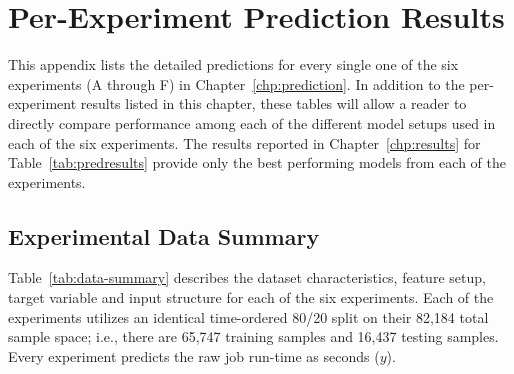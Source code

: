 \appendix

\chapter{Per-Experiment Prediction Results}\label{chp:app1}

This appendix lists the detailed predictions for every single one of the six experiments (A through F) in Chapter~\ref{chp:prediction}. In addition to the per-experiment results listed in this chapter, these tables will allow a reader to directly compare performance among each of the different model setups used in each of the six experiments. The results reported in Chapter~\ref{chp:results} for Table~\ref{tab:predresults} provide only the best performing models from each of the experiments.

\clearpage
\section{Experimental Data Summary}

Table~\ref{tab:data-summary} describes the dataset characteristics, feature setup, target variable and input structure for each of the six experiments. Each of the experiments utilizes an identical time-ordered 80/20 split on their 82,184 total sample space; i.e., there are 65,747 training samples and 16,437 testing samples. Every experiment predicts the raw job run-time as seconds ($y$).

